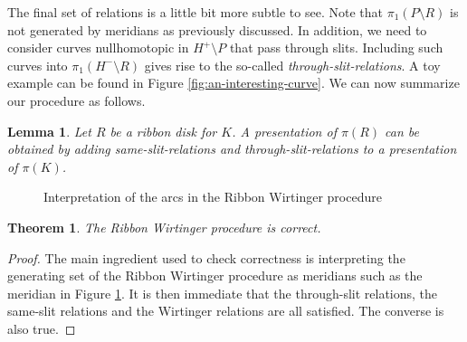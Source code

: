 \documentclass{article}
\newtheorem{lemma}{Lemma}
\newtheorem{theorem}{Theorem}
\theoremstyle{definition}
\begin{document}
The final set of relations is a little bit more subtle to see. Note that $\pi_1(P \setminus R)$ is not generated by meridians as previously discussed. In addition, we need to consider curves nullhomotopic in $H^+ \setminus P$ that pass through slits. Including such curves into $\pi_1(H^- \setminus R)$ gives rise to the so-called \textit{through-slit-relations}. A toy example can be found in Figure \ref{fig:an-interesting-curve}. We can now summarize our procedure as follows.

\begin{lemma}
Let $R$ be a ribbon disk for $K$.
A presentation of $\pi(R)$ can be obtained by adding same-slit-relations and through-slit-relations to a presentation of $\pi(K)$.
\end{lemma}

\begin{figure}[htb]
\centering
\begin{minipage}{0.5\textwidth}
\centering
{}
\end{minipage}%
\begin{minipage}{0.5\textwidth}
\centering
{}
\end{minipage}
\caption{Interpretation of the arcs in the Ribbon Wirtinger procedure}
\label{fig:arcs-interpretation}
\end{figure}


\begin{theorem}
The Ribbon Wirtinger procedure is correct.
\end{theorem}

\begin{proof}
The main ingredient used to check correctness is interpreting the generating set of the Ribbon Wirtinger procedure as meridians such as the meridian in Figure \ref{fig:arcs-interpretation}. It is then immediate that the through-slit relations, the same-slit relations and the Wirtinger relations are all satisfied. The converse is also true.
\end{proof}
\end{document}
